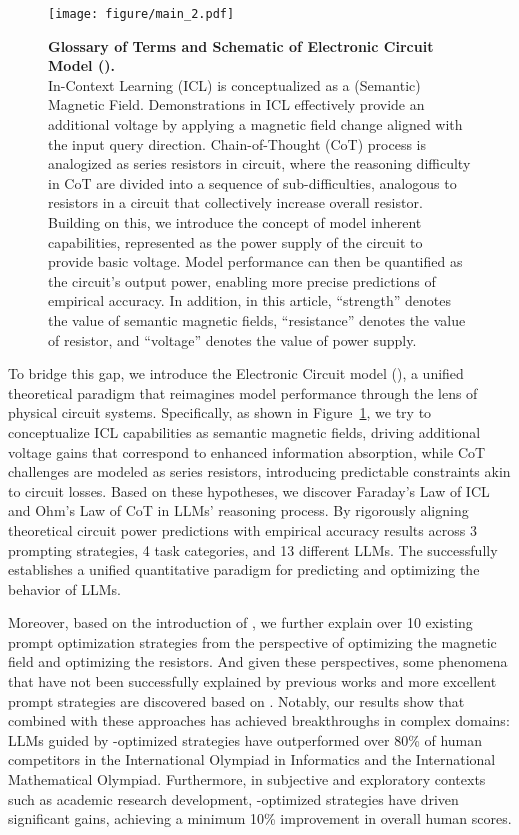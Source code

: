 \begin{figure}[t]
    \centering
    \texttt{[image: figure/main\_2.pdf]}
    \caption{\textbf{Glossary of Terms and Schematic of Electronic Circuit Model (\modelname{}).}\\
    In-Context Learning (ICL) is conceptualized as a (Semantic) Magnetic Field. Demonstrations in ICL effectively provide an additional voltage by applying a magnetic field change aligned with the input query direction. Chain-of-Thought (CoT) process is analogized as series resistors in circuit, where the reasoning difficulty in CoT are divided into a sequence of sub-difficulties, analogous to resistors in a circuit that collectively increase overall resistor. Building on this, we introduce the concept of model inherent capabilities, represented as the power supply of the circuit to provide basic voltage. Model performance can then be quantified as the circuit's output power, enabling more precise predictions of empirical accuracy. In addition, in this article, ``strength'' denotes the value of semantic magnetic fields, ``resistance'' denotes the value of resistor, and ``voltage'' denotes the value of power supply.\vspace{-5pt}
    }
    \label{fig:main}
\end{figure}

To bridge this gap, we introduce the Electronic Circuit model (\modelname{}), a unified theoretical paradigm that reimagines model performance through the lens of physical circuit systems. Specifically, as shown in Figure~\ref{fig:main}, we try to conceptualize ICL capabilities as semantic magnetic fields, driving additional voltage gains that correspond to enhanced information absorption, while CoT challenges are modeled as series resistors, introducing predictable constraints akin to circuit losses. Based on these hypotheses, we discover Faraday's Law of ICL and Ohm's Law of CoT in LLMs' reasoning process.
By rigorously aligning theoretical circuit power predictions with empirical accuracy results across 3 prompting strategies, 4 task categories, and 13 different LLMs.
The \modelname{} successfully establishes a unified quantitative paradigm for predicting and optimizing the behavior of LLMs.

Moreover, based on the introduction of \modelname{}, we further explain over 10 existing prompt optimization strategies from the perspective of optimizing the magnetic field and optimizing the resistors. And given these perspectives, some phenomena that have not been successfully explained by previous works and more excellent prompt strategies are discovered based on \modelname{}.
Notably, our results show that combined with these approaches has achieved breakthroughs in complex domains: LLMs guided by \modelname{}-optimized strategies have outperformed over 80\% of human competitors in the International Olympiad in Informatics and the International Mathematical Olympiad. Furthermore, in subjective and exploratory contexts such as academic research development, \modelname{}-optimized strategies have driven significant gains, achieving a minimum 10\% improvement in overall human scores.



